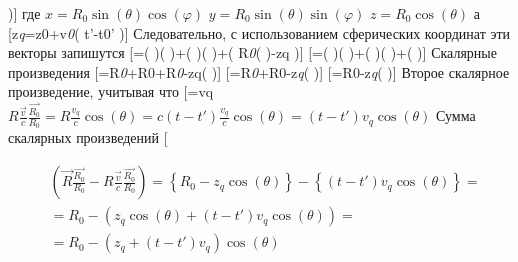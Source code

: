 \documentclass[11pt]{article}
\begin{document}
\right){]} где
\(x={{R}_{0}}\sin \left( \theta \right)\cos \left( \varphi \right)\)
\(y={{R}_{0}}\sin \left( \theta \right)\sin \left( \varphi \right)\)
\(z={{R}_{0}}\cos \left( \theta \right)\) а
{[}{{z}\emph{{q}}={{z}}{0}}+{{v}\emph{{0}}\left(
t'-{{t}}{0}}' \right){]} Следовательно, с использованием
сферических координат эти векторы запишутся
{[}=\sin \left(
\theta  \right)\cos \left(
\varphi  \right)+\sin \left(
\theta  \right)\sin \left( \varphi  \right)+\left(
{{R}\emph{{0}}\cos \left( \theta  \right)-{{z}}{q}}
\right){]}
{[}=\sin \left(
\theta  \right)\cos \left(
\varphi  \right)+\sin \left(
\theta  \right)\sin \left(
\varphi  \right)+\cos \left(
\theta  \right){]} Скалярные произведения
{[}={{R}\emph{{0}}+{{R}}{0}}+{{R}\emph{{0}}-{{z}}{q}}\cos \left(
\theta  \right){]}
{[}={{R}\emph{{0}}+{{R}}{0}}-{{z}\emph{{q}}\cos \left(
\theta  \right){]}
{[}={{R}}{0}}-{{z}\emph{{q}}\cos \left(
\theta  \right){]} Второе скалярное произведение, учитывая что
{[}={{v}}{q}}\overrightarrow{k}{]}
\(R\frac{\overrightarrow{v}}{c}\frac{\overrightarrow{{{R}_{0}}}}{{{R}_{0}}}=R\frac{{{v}_{q}}}{c}\cos \left( \theta \right)=c\left( t-t' \right)\frac{{{v}_{q}}}{c}\cos \left( \theta \right)=\left( t-t' \right){{v}_{q}}\cos \left( \theta \right)\)
Сумма скалярных произведений {[}

\begin{align}
  & \left( \overrightarrow{R}\frac{\overrightarrow{{{R}_{0}}}}{{{R}_{0}}}-R\frac{\overrightarrow{v}}{c}\frac{\overrightarrow{{{R}_{0}}}}{{{R}_{0}}} \right)=\left\{ {{R}_{0}}-{{z}_{q}}\cos \left( \theta  \right) \right\}-\left\{ \left( t-t' \right){{v}_{q}}\cos \left( \theta  \right) \right\}= \\ 
 & ={{R}_{0}}-\left( {{z}_{q}}\cos \left( \theta  \right)+\left( t-t' \right){{v}_{q}}\cos \left( \theta  \right) \right)= \\ 
 & ={{R}_{0}}-\left( {{z}_{q}}+\left( t-t' \right){{v}_{q}} \right)\cos \left( \theta  \right) \\ 
\end{align}
\end{document}
